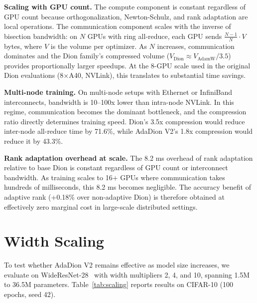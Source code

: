 \documentclass[10pt,twocolumn]{article}
\begin{document}
\textbf{Scaling with GPU count.} The compute component is constant regardless of GPU count because orthogonalization, Newton-Schulz, and rank adaptation are local operations. The communication component scales with the inverse of bisection bandwidth: on $N$ GPUs with ring all-reduce, each GPU sends $\frac{N-1}{N} \cdot V$ bytes, where $V$ is the volume per optimizer. As $N$ increases, communication dominates and the Dion family's compressed volume ($V_\text{Dion} \approx V_\text{AdamW}/3.5$) provides proportionally larger speedups. At the 8-GPU scale used in the original Dion evaluations (8$\times$A40, NVLink), this translates to substantial time savings.

\textbf{Multi-node training.} On multi-node setups with Ethernet or InfiniBand interconnects, bandwidth is 10--100x lower than intra-node NVLink. In this regime, communication becomes the dominant bottleneck, and the compression ratio directly determines training speed. Dion's 3.5x compression would reduce inter-node all-reduce time by 71.6\%, while AdaDion V2's 1.8x compression would reduce it by 43.3\%.

\textbf{Rank adaptation overhead at scale.} The 8.2 ms overhead of rank adaptation relative to base Dion is constant regardless of GPU count or interconnect bandwidth. As training scales to 16+ GPUs where communication takes hundreds of milliseconds, this 8.2 ms becomes negligible. The accuracy benefit of adaptive rank (+0.18\% over non-adaptive Dion) is therefore obtained at effectively zero marginal cost in large-scale distributed settings.

\section{Width Scaling}

To test whether AdaDion V2 remains effective as model size increases, we evaluate on WideResNet-28~\cite{zagoruyko2016wide} with width multipliers 2, 4, and 10, spanning 1.5M to 36.5M parameters. Table~\ref{tab:scaling} reports results on CIFAR-10 (100 epochs, seed 42).
\end{document}

